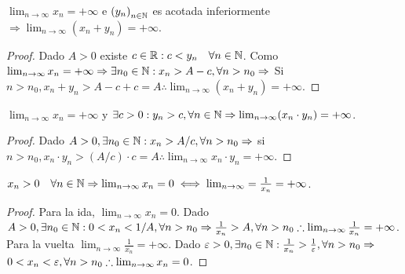 \begin{prop}
  \(\lim_{n \to \infty} x_n = + \infty \) e \({(y_n)}_{n \in \mathbb{N}} \) es acotada inferiormente \(\Rightarrow \lim_{n \to \infty} (x_n + y_n) = +\infty \).
  \begin{proof}
    Dado \(A > 0 \) existe \( c \in \mathbb{R} : c < y_n \quad \forall n \in \mathbb{N} \).
    Como \(\lim_{n \to \infty} x_n = + \infty \Rightarrow \exists n_0 \in \mathbb{N} : x_n > A - c, \forall n > n_0 \Rightarrow \)
    Si \(n > n_0, x_n + y_n > A - c + c = A \therefore \lim_{n \to \infty} (x_n + y_n) = +\infty \).
  \end{proof}
\end{prop}

\begin{prop}
  \(\lim_{n \to \infty} x_n = +\infty \) y \(\exists c > 0 : y_n > c, \forall n \in \mathbb{N} \Rightarrow \lim_{n \to \infty} (x_n \cdot y_n) = + \infty \).
  \begin{proof}
    Dado \(A > 0, \exists n_0 \in \mathbb{N} : x_n > A/c, \forall n > n_0 \Rightarrow \) si \(n > n_0, x_n \cdot y_n > (A/c) \cdot c = A \therefore \lim_{n \to \infty} x_n \cdot y_n = + \infty\).
  \end{proof}
\end{prop}

\begin{prop}
  \(x_n > 0 \quad \forall n \in \mathbb{N} \Rightarrow \lim_{n \to \infty} x_n = 0 \iff \lim_{n \to \infty} = \frac{1}{x_n} = +\infty\).
  \begin{proof}
    Para la ida, \(\lim_{n \to \infty} x_n = 0\). Dado \(A > 0, \exists n_0 \in \mathbb{N} : 0 < x_n < 1/A, \forall n > n_0 \Rightarrow \frac{1}{x_n} > A, \forall n > n_0 \therefore \lim_{n \to \infty} \frac{1}{x_n} = +\infty\). \\
    Para la vuelta \(\lim_{n \to \infty} \frac{1}{x_n} = +\infty \). Dado \(\varepsilon > 0, \exists n_0 \in \mathbb{N} : \frac{1}{x_n} > \frac{1}{\varepsilon}, \forall n > n_0 \Rightarrow \) \\
    \(0 < x_n < \varepsilon, \forall n > n_0 \therefore \lim_{n \to \infty} x_n = 0\).
  \end{proof}
\end{prop}

